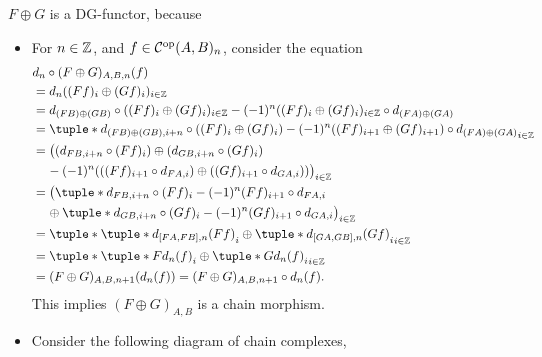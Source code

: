 \begin{remark}
    \( F \oplus G \) is a DG-functor, because
    \begin{itemize}
        \item {
            For \( n \in {\mathbb{Z}} \), and \( f \in {\mathcal{C}}^{\operatorname{op}}(A, B)_n \), consider the equation
            \begin{align*}
                &d_n \circ (F \oplus G)_{A, B, n} (f) \\
                &= d_n ((F f)_i \oplus (G f)_i)_{i \in \Zb} \\
                &= d_{(F B) \oplus (G B)} \circ ((F f)_i \oplus (G f)_i)_{i \in \Zb} - (-1)^n ((F f)_i \oplus (G f)_i)_{i \in \Zb} \circ d_{(F A) \oplus (G A)} \\
                &= \tuple*{d_{(F B) \oplus (G B), i + n} \circ ((F f)_i \oplus (G f)_i) - (-1)^n ((F f)_{i + 1} \oplus (G f)_{i + 1}) \circ d_{(F A) \oplus (G A)}}_{i \in \Zb} \\
                &= \big( (d_{F B, i + n} \circ (F f)_i) \oplus (d_{G B, i + n} \circ (G f)_i) \\
                &\hspace{0.4cm} - (-1)^n ( ( (F f)_{i + 1} \circ d_{F A, i} ) \oplus ( (G f)_{i + 1} \circ d_{G A, i} ) ) \big)_{i \in \Zb} \\
                &= \big( \tuple*{d_{F B, i + n} \circ (F f)_i - (-1)^n (F f)_{i + 1} \circ d_{F A, i}} \\
                &\hspace{0.4cm} \oplus \tuple*{d_{G B, i + n} \circ (G f)_i - (-1)^n (G f)_{i + 1} \circ d_{G A, i}} \big)_{i \in \Zb} \\
                &= \tuple*{ \tuple*{d_{[F A, F B], n} (F f)}_i \oplus \tuple*{ d_{[G A, G B], n} (G f)}_i }_{i \in \Zb} \\
                &= \tuple*{ \tuple*{F d_n (f)}_i \oplus \tuple*{ G d_n (f)}_i }_{i \in \Zb} \\
                &= (F \oplus G)_{A, B, n + 1} (d_n (f)) = (F \oplus G)_{A, B, n + 1} \circ d_n (f).
            \end{align*}
            This implies \( (F \oplus G)_{A, B} \) is a chain morphism.
        }
        \item {
            Consider the following diagram of chain complexes,
            \begin{center}
\end{center}}
\end{itemize}
\end{remark}
